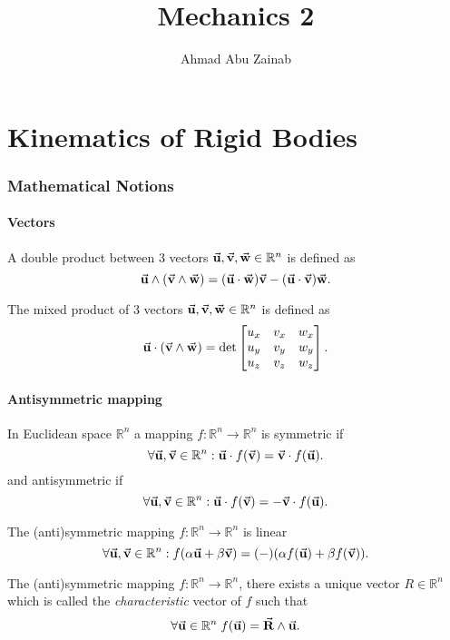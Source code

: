 \documentclass[a4paper,12pt]{article}
\title{Mechanics 2}
\date{}
\author{Ahmad Abu Zainab}
\affiliation{Lebanese University Faculty of Engineering\\\href{http://www.ulfg.ul.edu.lb/}{Website}}
\begin{document}
\maketitle
\part{Kinematics of Rigid Bodies}
\section{Mathematical Notions}

\subsection{Vectors}
\begin{definition}
	A double product between 3 vectors $\va{u},\va{v},\va{w}\in \mathbb{R}^n$ is defined as
	\[
		\va{u}\land(\va{v}\land \va{w})= (\va{u}\cdot \va{w})\va{v} - (\va{u}\cdot \va{v})\va{w}
		.\]
\end{definition}

\begin{definition}
	The mixed product of 3 vectors $\va{u},\va{v},\va{w}\in \mathbb{R}^n$ is defined as
	\[
		\va{u}\cdot (\va{v}\land \va{w})= \det \begin{bmatrix} u_x&v_x&w_x\\u_y&v_y&w_y\\u_z&v_z&w_z \end{bmatrix}
		.\]
\end{definition}

\subsection{Antisymmetric mapping}

\begin{definition}
	In Euclidean space $\mathbb{R}^n$ a mapping $f:\mathbb{R}^n\to \mathbb{R}^n$ is symmetric if
	\[
		\forall \va{u},\va{v}\in \mathbb{R}^n: \va{u}\cdot f(\va{v})=\va{v}\cdot f(\va{u})
		.\]
	and antisymmetric if
	\[
		\forall \va{u},\va{v}\in \mathbb{R}^n: \va{u}\cdot f(\va{v})=-\va{v}\cdot f(\va{u})
		.\]
\end{definition}
\begin{remark}
	The (anti)symmetric mapping $f:\mathbb{R}^n\to \mathbb{R}^n$ is linear
	\[
		\forall \va{u},\va{v}\in \mathbb{R}^n: f(\alpha \va{u}+\beta \va{v})=(-)(\alpha f(\va{u})+\beta f(\va{v}))
		.\]
\end{remark}
\begin{theorem}
	The (anti)symmetric mapping $f:\mathbb{R}^n\to \mathbb{R}^n$, there exists a unique vector $R\in \mathbb{R}^n$ which is called the \emph{characteristic} vector of $f$ such that
	\[
		\forall \va{u}\in\mathbb{R}^n\;f(\va{u})=\va{R}\land \va{u}
		.\]
\end{theorem}
\newpage
\end{document}
